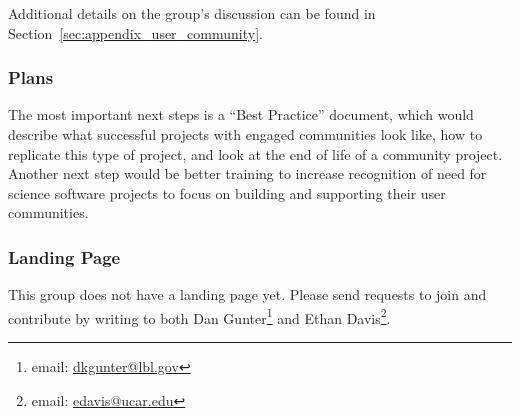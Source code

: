 Additional details on the group's discussion can be found in
Section~\ref{sec:appendix_user_community}.

\subsubsection{Plans}

The most important next steps is a ``Best Practice'' document, which would
describe what successful projects with engaged communities look like, how to
replicate this type of project, and look at the end of life of a community project.
Another next step would be better training to increase recognition of need for science software
projects to focus on building and supporting their user communities.

\subsubsection{Landing Page}

This group does not have a landing page yet. Please send requests to join and
contribute by writing to both Dan Gunter\footnote{email:
\href{mailto:dkgunter@lbl.gov}{dkgunter@lbl.gov}} and Ethan
Davis\footnote{email: \href{mailto:edavis@ucar.edu}{edavis@ucar.edu}}.
